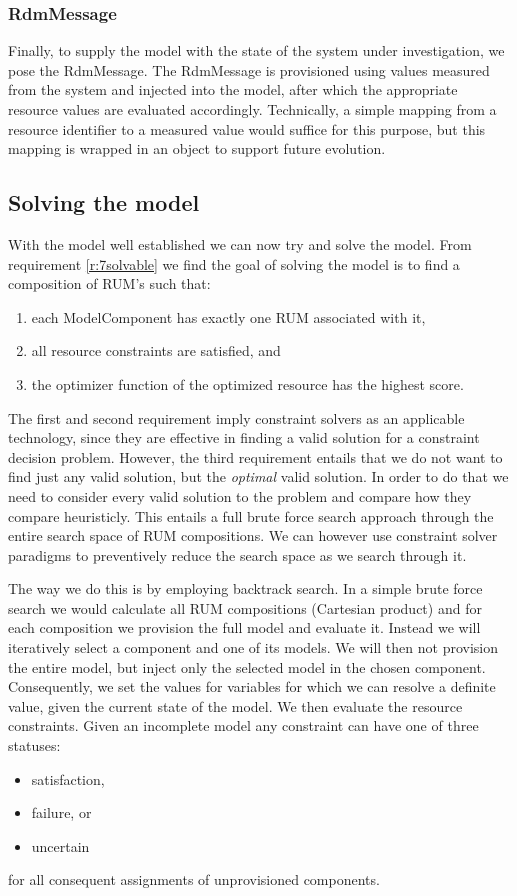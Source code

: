 \subsubsection{RdmMessage}
Finally, to supply the model with the state of the system under investigation, we pose the RdmMessage. The RdmMessage is provisioned using values measured from the system and injected into the model, after which the appropriate resource values are evaluated accordingly. Technically, a simple mapping from a resource identifier to a measured value would suffice for this purpose, but this mapping is wrapped in an object to support future evolution.

\subsection{Solving the model}
With the model well established we can now try and solve the model. From requirement \ref{r:7solvable} we find the goal of solving the model is to find a composition of RUM's such that:
\begin{enumerate}
\nospace
\item each ModelComponent has exactly one RUM associated with it,
\item all resource constraints are satisfied, and
\item the optimizer function of the optimized resource has the highest score.
\end{enumerate}
The first and second requirement imply constraint solvers as an applicable technology, since they are effective in finding a valid solution for a constraint decision problem. However, the third requirement entails that we do not want to find just any valid solution, but the \emph{optimal} valid solution. In order to do that we need to consider every valid solution to the problem and compare how they compare heuristicly. This entails a full brute force search approach through the entire search space of RUM compositions. We can however use constraint solver paradigms to preventively reduce the search space as we search through it.

The way we do this is by employing backtrack search. In a simple brute force search we would calculate all RUM compositions (Cartesian product) and for each composition we provision the full model and evaluate it. Instead we will iteratively select a component and one of its models. We will then not provision the entire model, but inject only the selected model in the chosen component. Consequently, we set the values for variables for which we can resolve a definite value, given the current state of the model. We then evaluate the resource constraints. Given an incomplete model any constraint can have one of three statuses:
\begin{itemize}
\nospace
\item satisfaction,
\item failure, or
\item uncertain
\end{itemize}
for all consequent assignments of unprovisioned components.

